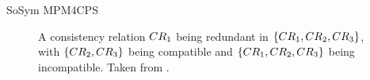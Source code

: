 \begin{copiedFrom}{SoSym MPM4CPS}




\begin{figure}
    \centering
    
    \caption[Incompatibility with redundant consistency relation]{A consistency relation $CR_{1}$ being redundant in  $\{ CR_{1}, CR_{2}, CR_{3} \}$, with $\{ CR_{2}, CR_{3} \}$ being compatible and $\{ CR_{1}, CR_{2},CR_{3} \}$ being incompatible. Taken from .}
    \label{fig:correctness:formal:redundancy_compatibility_counterexample}
\end{figure}


\end{copiedFrom}
